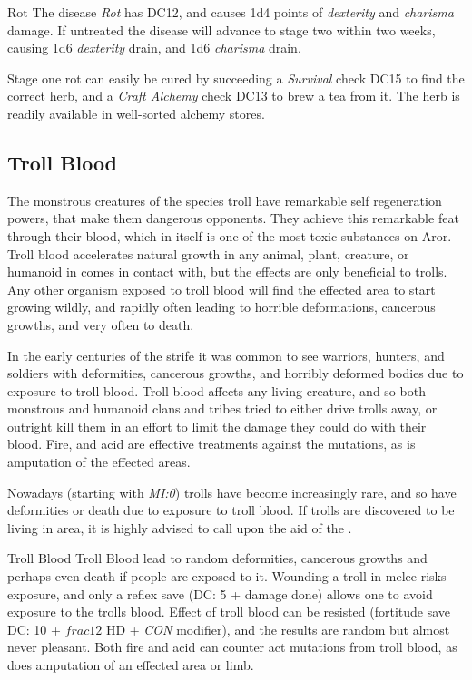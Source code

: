 \begin{35e}{Rot}
  The disease \emph{Rot} has DC12, and causes 1d4 points of \emph{dexterity}
  and \emph{charisma} damage. If untreated the disease will advance to stage
  two within two weeks, causing 1d6 \emph{dexterity} drain, and 1d6
  \emph{charisma} drain.

  Stage one rot can easily be cured by succeeding a \emph{Survival} check DC15
  to find the correct herb, and a \emph{Craft Alchemy} check DC13 to brew a
  tea from it. The herb is readily available in well-sorted alchemy stores.
\end{35e}

\subsection{Troll Blood}
\label{sec:Troll Blood}

The monstrous creatures of the species troll have remarkable self regeneration
powers, that make them dangerous opponents. They achieve this remarkable feat
through their blood, which in itself is one of the most toxic substances on
Aror. Troll blood accelerates natural growth in any animal, plant, creature,
or humanoid in comes in contact with, but the effects are only beneficial to
trolls. Any other organism exposed to troll blood will find the effected area
to start growing wildly, and rapidly often leading to horrible deformations,
cancerous growths, and very often to death.

In the early centuries of the strife it was common to see warriors, hunters,
and soldiers with deformities, cancerous growths, and horribly deformed bodies
due to exposure to troll blood. Troll blood affects any living creature, and
so both monstrous and humanoid clans and tribes tried to either drive trolls
away, or outright kill them in an effort to limit the damage they could do with
their blood. Fire, and acid are effective treatments against the mutations, as
is amputation of the effected areas.

Nowadays (starting with \emph{MI:0}) trolls have become increasingly rare, and
so have deformities or death due to exposure to troll blood. If trolls are
discovered to be living in area, it is highly advised to call upon the aid of
the .

\begin{35e}{Troll Blood}
  Troll Blood lead to random deformities, cancerous growths and perhaps even
  death if people are exposed to it. Wounding a troll in melee risks exposure,
  and only a reflex save (DC: 5 + damage done) allows one to avoid exposure to
  the trolls blood. Effect of troll blood can be resisted (fortitude save DC:
  10 + $ frac{1}{2} $ HD + \emph{CON} modifier), and the results are random
  but almost never pleasant. Both fire and acid can counter act mutations from
  troll blood, as does amputation of an effected area or limb.
\end{35e}
